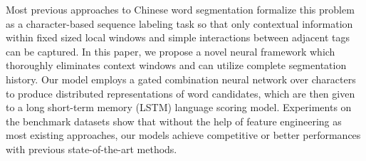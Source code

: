 Most previous approaches to Chinese word segmentation formalize this problem as a character-based sequence labeling task so that only contextual information within fixed sized local windows and simple interactions between adjacent tags can be captured. In this paper, we propose a novel neural framework which thoroughly eliminates context windows and can utilize complete segmentation history. Our model employs a gated combination neural network over characters to produce distributed representations of word candidates, which are then given to a long short-term memory (LSTM) language scoring model. Experiments on the benchmark datasets show that without the help of feature engineering as most existing approaches, our models achieve competitive or better performances with previous state-of-the-art methods.
